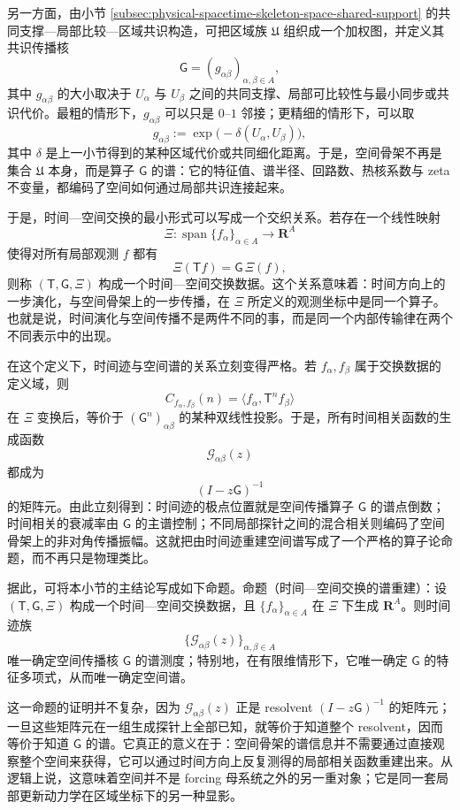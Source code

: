另一方面，由小节 \ref{subsec:physical-spacetime-skeleton-space-shared-support} 的共同支撑—局部比较—区域共识构造，可把区域族 \(\mathfrak U\) 组织成一个加权图，并定义其共识传播核
\[
\mathsf G=(g_{\alpha\beta})_{\alpha,\beta\in A},
\]
其中 \(g_{\alpha\beta}\) 的大小取决于 \(U_\alpha\) 与 \(U_\beta\) 之间的共同支撑、局部可比较性与最小同步或共识代价。最粗的情形下，\(g_{\alpha\beta}\) 可以只是 \(0\)--\(1\) 邻接；更精细的情形下，可以取
\[
g_{\alpha\beta}:=\exp\!\bigl(-\delta(U_\alpha,U_\beta)\bigr),
\]
其中 \(\delta\) 是上一小节得到的某种区域代价或共同细化距离。于是，空间骨架不再是集合 \(\mathfrak U\) 本身，而是算子 \(\mathsf G\) 的谱：它的特征值、谱半径、回路数、热核系数与 zeta 不变量，都编码了空间如何通过局部共识连接起来。

于是，时间—空间交换的最小形式可以写成一个交织关系。若存在一个线性映射
\[
\Xi:\operatorname{span}\{f_\alpha\}_{\alpha\in A}\to \mathbf R^A
\]
使得对所有局部观测 \(f\) 都有
\[
\Xi(\mathsf T f)=\mathsf G\,\Xi(f),
\]
则称 \((\mathsf T,\mathsf G,\Xi)\) 构成一个时间—空间交换数据。这个关系意味着：时间方向上的一步演化，与空间骨架上的一步传播，在 \(\Xi\) 所定义的观测坐标中是同一个算子。也就是说，时间演化与空间传播不是两件不同的事，而是同一个内部传输律在两个不同表示中的出现。

在这个定义下，时间迹与空间谱的关系立刻变得严格。若 \(f_\alpha,f_\beta\) 属于交换数据的定义域，则
\[
C_{f_\alpha,f_\beta}(n)
=
\langle f_\alpha,\mathsf T^n f_\beta\rangle
\]
在 \(\Xi\) 变换后，等价于 \((\mathsf G^n)_{\alpha\beta}\) 的某种双线性投影。于是，所有时间相关函数的生成函数
\[
\mathcal G_{\alpha\beta}(z)
\]
都成为
\[
(I-z\mathsf G)^{-1}
\]
的矩阵元。由此立刻得到：时间迹的极点位置就是空间传播算子 \(\mathsf G\) 的谱点倒数；时间相关的衰减率由 \(\mathsf G\) 的主谱控制；不同局部探针之间的混合相关则编码了空间骨架上的非对角传播振幅。这就把由时间迹重建空间谱写成了一个严格的算子论命题，而不再只是物理类比。

据此，可将本小节的主结论写成如下命题。命题（时间—空间交换的谱重建）：设 \((\mathsf T,\mathsf G,\Xi)\) 构成一个时间—空间交换数据，且 \(\{f_\alpha\}_{\alpha\in A}\) 在 \(\Xi\) 下生成 \(\mathbf R^A\)。则时间迹族
\[
\{\mathcal G_{\alpha\beta}(z)\}_{\alpha,\beta\in A}
\]
唯一确定空间传播核 \(\mathsf G\) 的谱测度；特别地，在有限维情形下，它唯一确定 \(\mathsf G\) 的特征多项式，从而唯一确定空间谱。

这一命题的证明并不复杂，因为 \(\mathcal G_{\alpha\beta}(z)\) 正是 resolvent \((I-z\mathsf G)^{-1}\) 的矩阵元；一旦这些矩阵元在一组生成探针上全部已知，就等价于知道整个 resolvent，因而等价于知道 \(\mathsf G\) 的谱。它真正的意义在于：空间骨架的谱信息并不需要通过直接观察整个空间来获得，它可以通过时间方向上反复测得的局部相关函数重建出来。从逻辑上说，这意味着空间并不是 forcing 母系统之外的另一重对象；它是同一套局部更新动力学在区域坐标下的另一种显影。


